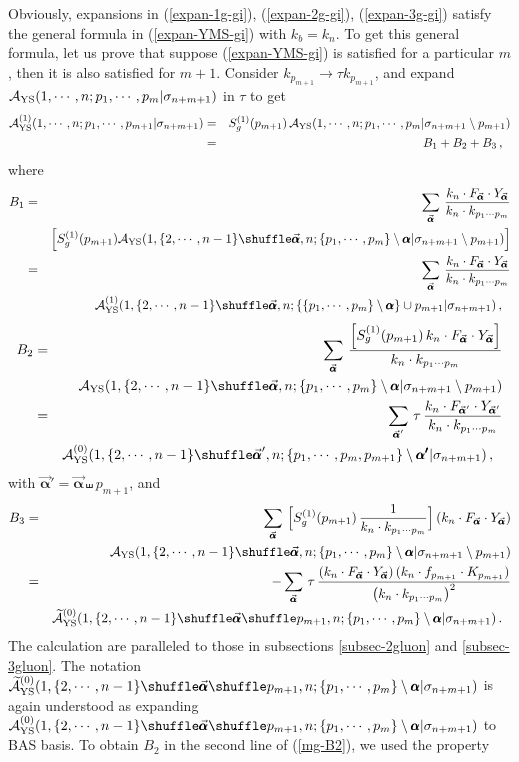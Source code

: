 \documentclass[11pt,a4paper]{article}
\newcommand{\bea}{\begin{eqnarray}}
\newcommand{\eea}{\end{eqnarray}}
\newcommand{\nn}{\nonumber \\}
\def\W #1{\widetilde{#1}}
\def\eref#1{(\ref{#1})}
\def\a{{\alpha}}
\begin{document}
Obviously, expansions in \eref{expan-1g-gi}, \eref{expan-2g-gi}, \eref{expan-3g-gi} satisfy the general formula in \eref{expan-YMS-gi} with $k_b=k_n$. To get this general formula, let us prove that suppose \eref{expan-YMS-gi} is satisfied for a particular $m$, then it is also satisfied for $m+1$. Consider $k_{p_{m+1}}\to\tau k_{p_{m+1}}$, and expand ${\cal A}_{\rm YS}(1,\cdots,n;p_1,\cdots,p_m|\sigma_{n+m+1})$ in $\tau$ to get
%
\bea
{\cal A}^{(1)}_{\rm YS}(1,\cdots,n;p_1,\cdots,p_{m+1}|\sigma_{n+m+1})
&=&S^{(1)}_g(p_{m+1})\,{\cal A}_{\rm YS}(1,\cdots,n;p_1,\cdots,p_m|\sigma_{n+m+1}\setminus p_{m+1})\nn
&=&B_1+B_2+B_3\,,~~\label{3B}
\eea
%
where
%
\bea
B_1&=&\sum_{\vec{\pmb{\a}}}\,{k_n\cdot F_{\vec{\pmb{\a}}}\cdot Y_{\vec{\pmb{\a}}}\over k_n\cdot k_{p_1\cdots p_m}}\nn
& &\Big[S^{(1)}_g(p_{m+1}){\cal A}_{\rm YS}(1,\{2,\cdots,n-1\}\shuffle\vec{\pmb{\a}},n;\{p_1,\cdots,p_m\}\setminus\pmb{\a}|\sigma_{n+m+1}\setminus p_{m+1})\Big]\nn
&=&\sum_{\vec{\pmb{\a}}}\,{k_n\cdot F_{\vec{\pmb{\a}}}\cdot Y_{\vec{\pmb{\a}}}\over k_n\cdot k_{p_1\cdots p_m}}\nn
& &{\cal A}^{(1)}_{\rm YS}(1,\{2,\cdots,n-1\}\shuffle\vec{\pmb{\a}},n;\{\{p_1,\cdots,p_m\}\setminus\pmb{\a}\}\cup p_{m+1}|\sigma_{n+m+1})\,,~~\label{mg-B1}
\eea
%
%
\bea
B_2
&=&\sum_{\vec{\pmb{\a}}}\,{\Big[S^{(1)}_g(p_{m+1})\,k_n\cdot F_{\vec{\pmb{\a}}}\cdot Y_{\vec{\pmb{\a}}}\Big]\over k_n\cdot k_{p_1\cdots p_m}}\nn
& &{\cal A}_{\rm YS}(1,\{2,\cdots,n-1\}\shuffle\vec{\pmb{\a}},n;\{p_1,\cdots,p_m\}\setminus\pmb{\a}|\sigma_{n+m+1}\setminus p_{m+1})\nn
&=&\sum_{\vec{\pmb{\a}}'}\,\tau\,{k_n\cdot F_{\vec{\pmb{\a}}'}\cdot Y_{\vec{\pmb{\a}}'}\over k_n\cdot k_{p_1\cdots p_m}}\nn
& &{\cal A}^{(0)}_{\rm YS}(1,\{2,\cdots,n-1\}\shuffle\vec{\pmb{\a}}',n;\{p_1,\cdots,p_m,p_{m+1}\}\setminus\pmb{\a'}|\sigma_{n+m+1})\,,~~\label{mg-B2}
\eea
%
with $\vec{\pmb{\a}}'=\vec{\pmb{\a}}\shuffle p_{m+1}$, and
%
\bea
B_3
&=&\sum_{\vec{\pmb{\a}}}\,\Big[S^{(1)}_g(p_{m+1})\,{1\over k_n\cdot k_{p_1\cdots p_m}}\Big]\,(k_n\cdot F_{\vec{\pmb{\a}}}\cdot Y_{\vec{\pmb{\a}}})\nn
& &{\cal A}_{\rm YS}(1,\{2,\cdots,n-1\}\shuffle\vec{\pmb{\a}},n;\{p_1,\cdots,p_m\}\setminus\pmb{\a}|\sigma_{n+m+1}\setminus p_{m+1})\nn
&=&-\sum_{\vec{\pmb{\a}}}\,\tau\,{(k_n\cdot F_{\vec{\pmb{\a}}}\cdot Y_{\vec{\pmb{\a}}})\,(k_n\cdot f_{p_{m+1}}\cdot K_{p_{m+1}})\over \big(k_n\cdot k_{p_1\cdots p_m}\big)^2}\nn
& &\W{\cal A}^{(0)}_{\rm YS}(1,\{2,\cdots,n-1\}\shuffle\vec{\pmb{\a}}\shuffle p_{m+1},n;\{p_1,\cdots,p_m\}\setminus\pmb{\a}|\sigma_{n+m+1})\,.~~\label{mg-B3}
\eea
%
The calculation are paralleled to those in subsections \ref{subsec-2gluon} and \ref{subsec-3gluon}. The notation $\W{\cal A}^{(0)}_{\rm YS}(1,\{2,\cdots,n-1\}\shuffle\vec{\pmb{\a}}\shuffle p_{m+1},n;\{p_1,\cdots,p_m\}\setminus\pmb{\a}|\sigma_{n+m+1})$ is again understood as expanding ${\cal A}^{(0)}_{\rm YS}(1,\{2,\cdots,n-1\}\shuffle\vec{\pmb{\a}}\shuffle p_{m+1},n;\{p_1,\cdots,p_m\}\setminus\pmb{\a}|\sigma_{n+m+1})$ to BAS basis. To obtain $B_2$ in the second line of \eref{mg-B2}, we used the property
\end{document}
